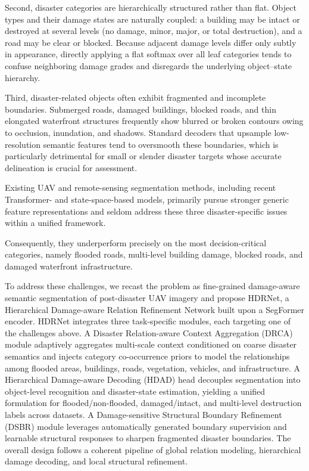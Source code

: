 \documentclass[lettersize,journal]{IEEEtran}
\begin{document}
Second, disaster categories are hierarchically structured rather than flat. Object types and their damage states are naturally coupled: a building may be intact or destroyed at several levels (no damage, minor, major, or total destruction), and a road may be clear or blocked. Because adjacent damage levels differ only subtly in appearance, directly applying a flat softmax over all leaf categories tends to confuse neighboring damage grades and disregards the underlying object--state hierarchy\cite{fuDeepOrdinalRegression2018a, liDeepHierarchicalSemantic2022}.

Third, disaster-related objects often exhibit fragmented and incomplete boundaries. Submerged roads, damaged buildings, blocked roads, and thin elongated waterfront structures frequently show blurred or broken contours owing to occlusion, inundation, and shadows. Standard decoders that upsample low-resolution semantic features tend to oversmooth these boundaries, which is particularly detrimental for small or slender disaster targets whose accurate delineation is crucial for assessment\cite{kervadecBoundaryLossHighly2021, takikawaGatedSCNNGatedShape2019}.

Existing UAV and remote-sensing segmentation methods, including recent Transformer- and state-space-based models, primarily pursue stronger generic feature representations and seldom address these three disaster-specific issues within a unified framework\cite{wangUAVSegDualEncoderCrossScale2025,maMultilevelMultimodalFusion2024,huangMambaUAVSegNetMultiscaleAdaptive2024}. 

Consequently, they underperform precisely on the most decision-critical categories, namely flooded roads, multi-level building damage, blocked roads, and damaged waterfront infrastructure.

To address these challenges, we recast the problem as fine-grained damage-aware semantic segmentation of post-disaster UAV imagery and propose HDRNet, a Hierarchical Damage-aware Relation Refinement Network built upon a SegFormer encoder. HDRNet integrates three task-specific modules, each targeting one of the challenges above. A Disaster Relation-aware Context Aggregation (DRCA) module adaptively aggregates multi-scale context conditioned on coarse disaster semantics and injects category co-occurrence priors to model the relationships among flooded areas, buildings, roads, vegetation, vehicles, and infrastructure. A Hierarchical Damage-aware Decoding (HDAD) head decouples segmentation into object-level recognition and disaster-state estimation, yielding a unified formulation for flooded/non-flooded, damaged/intact, and multi-level destruction labels across datasets. A Damage-sensitive Structural Boundary Refinement (DSBR) module leverages automatically generated boundary supervision and learnable structural responses to sharpen fragmented disaster boundaries. The overall design follows a coherent pipeline of global relation modeling, hierarchical damage decoding, and local structural refinement.
\end{document}

